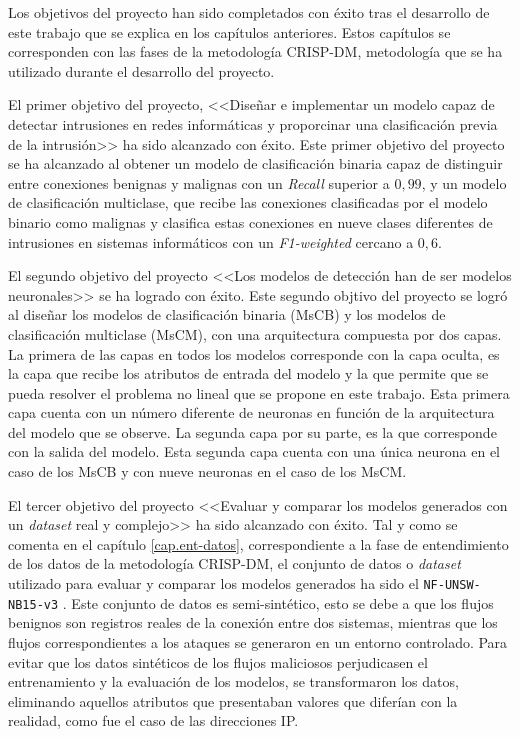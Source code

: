 Los objetivos del proyecto han sido completados con éxito tras el desarrollo de este trabajo que se explica en los capítulos anteriores.
Estos capítulos se corresponden con las fases de la metodología CRISP-DM, metodología que se ha utilizado durante el desarrollo del proyecto.

El primer objetivo del proyecto, <<Diseñar e implementar un modelo capaz de detectar intrusiones en redes informáticas y proporcinar una clasificación previa de la intrusión>> ha sido alcanzado con éxito. Este primer objetivo del proyecto se ha alcanzado al obtener un modelo de clasificación binaria capaz de distinguir entre conexiones benignas y malignas con un \textit{Recall} superior a $0,99$, y un modelo de clasificación multiclase, que recibe las conexiones clasificadas por el modelo binario como malignas y clasifica estas conexiones en nueve clases diferentes de intrusiones en sistemas informáticos con un \textit{F1-weighted} cercano a $0,6$.

El segundo objetivo del proyecto <<Los modelos de detección han de ser modelos neuronales>> se ha logrado con éxito. Este segundo objtivo del proyecto se logró al diseñar los modelos de clasificación binaria (MsCB) y los modelos de clasificación multiclase (MsCM), con una arquitectura compuesta por dos capas. La primera de las capas en todos los modelos corresponde con la capa oculta, es la capa que recibe los atributos de entrada del modelo y la que permite que se pueda resolver el problema no lineal que se propone en este trabajo. Esta primera capa cuenta con un número diferente de neuronas en función de la arquitectura del modelo que se observe. La segunda capa por su parte, es la que corresponde con la salida del modelo. Esta segunda capa cuenta con una única neurona en el caso de los MsCB y con nueve neuronas en el caso de los MsCM.

El tercer objetivo del proyecto <<Evaluar y comparar los modelos generados con un \textit{dataset} real y complejo>> ha sido alcanzado con éxito. Tal y como se comenta en el capítulo \ref{cap.ent-datos}, correspondiente a la fase de entendimiento de los datos de la metodología CRISP-DM, el conjunto de datos o \textit{dataset} utilizado para evaluar y comparar los modelos generados ha sido el \texttt{NF-UNSW-NB15-v3} \cite{luay2025NetFlowDatasetsV3}. Este conjunto de datos es semi-sintético, esto se debe a que los flujos benignos son registros reales de la conexión entre dos sistemas, mientras que los flujos correspondientes a los ataques se generaron en un entorno controlado. Para evitar que los datos sintéticos de los flujos maliciosos perjudicasen el entrenamiento y la evaluación de los modelos, se transformaron los datos, eliminando aquellos atributos que presentaban valores que diferían con la realidad, como fue el caso de las direcciones IP.

